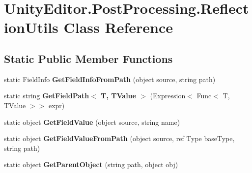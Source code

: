 \hypertarget{class_unity_editor_1_1_post_processing_1_1_reflection_utils}{}\section{Unity\+Editor.\+Post\+Processing.\+Reflection\+Utils Class Reference}
\label{class_unity_editor_1_1_post_processing_1_1_reflection_utils}
\subsection*{Static Public Member Functions}
\begin{DoxyCompactItemize}
\item 
\mbox{\label{class_unity_editor_1_1_post_processing_1_1_reflection_utils_afb51a45fa3cb4823ee4a57978c6f3742}} 
static Field\+Info {\bfseries Get\+Field\+Info\+From\+Path} (object source, string path)
\item 
\mbox{\label{class_unity_editor_1_1_post_processing_1_1_reflection_utils_aa685badc9be509cd534a5b8f36b766bc}} 
static string {\bfseries Get\+Field\+Path$<$ T, T\+Value $>$} (Expression$<$ Func$<$ T, T\+Value $>$$>$ expr)
\item 
\mbox{\label{class_unity_editor_1_1_post_processing_1_1_reflection_utils_a331c1ec710785e3a2e6b87ecf379c7bd}} 
static object {\bfseries Get\+Field\+Value} (object source, string name)
\item 
\mbox{\label{class_unity_editor_1_1_post_processing_1_1_reflection_utils_af06ab5437079d8ea80ac2eeb220b5599}} 
static object {\bfseries Get\+Field\+Value\+From\+Path} (object source, ref Type base\+Type, string path)
\item 
\mbox{\label{class_unity_editor_1_1_post_processing_1_1_reflection_utils_a70d1948fae4fb73e77b7dc6e531cf034}} 
static object {\bfseries Get\+Parent\+Object} (string path, object obj)
\end{DoxyCompactItemize}

